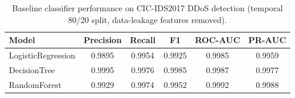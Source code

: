 \begin{table}
\caption{Baseline classifier performance on CIC-IDS2017 DDoS detection (temporal 80/20 split, data-leakage features removed).}
\label{tab:baseline_results}
\begin{tabular}{lccccc}
\toprule
Model & Precision & Recall & F1 & ROC-AUC & PR-AUC \\
\midrule
LogisticRegression & 0.9895 & 0.9954 & 0.9925 & 0.9985 & 0.9959 \\
DecisionTree & 0.9995 & 0.9976 & 0.9985 & 0.9987 & 0.9977 \\
RandomForest & 0.9929 & 0.9974 & 0.9952 & 0.9992 & 0.9988 \\
\bottomrule
\end{tabular}
\end{table}
